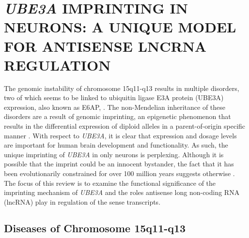%
%
%



\pagestyle{plain} %
\setcounter{page}{1}


\chapter{\uppercase {\textit{UBE3A} imprinting in neurons: a unique model for antisense lncRNA regulation}}

The genomic instability of chromosome 15q11-q13 results in multiple disorders, two of which seems to be linked to ubiquitin ligase E3A protein (UBE3A) expression, also known as E6AP, \cite{Christian1999,Kishino1997,Matsuura1997,Nurmi2001}. The non-Mendelian inheritance of these disorders are a result of genomic imprinting, an epigenetic phenomenon that results in the differential expression of diploid alleles in a parent-of-origin specific manner \cite{Russo1996}. With respect to \textit{UBE3A}, it is clear that expression and dosage levels are important for human brain development and functionality. As such, the unique imprinting of \textit{UBE3A} in only neurons is perplexing. Although it is possible that the imprint could be an innocent bystander, the fact that it has been evolutionarily constrained for over 100 million years suggests otherwise \cite{Rapkins2006}. The focus of this review is to examine the functional significance of the imprinting mechanism of \textit{UBE3A} and the roles antisense long non-coding RNA (lncRNA) play in regulation of the sense transcripts.

\section{Diseases of Chromosome 15q11-q13}

